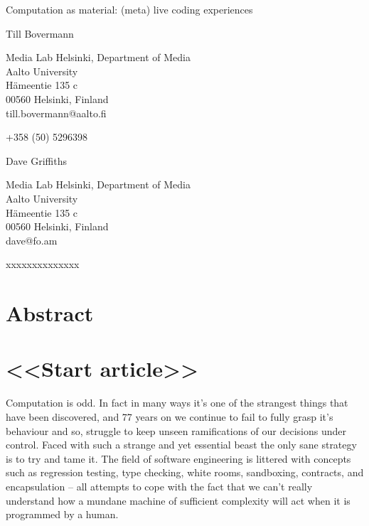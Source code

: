 \documentclass[letterpaper, 12pt]{article}
\begin{document}
{\cmjTitle 	Computation as material: (meta) live coding experiences}
\vspace*{24pt}


{\cmjAuthor Till Bovermann}
\newline
\begin{cmjAuthorAddress}
	Media Lab Helsinki, Department of Media\\
	Aalto University\\
	H\"ameentie 135 c\\
	00560 Helsinki, Finland\\
	till.bovermann@aalto.fi
\end{cmjAuthorAddress}

\vspace*{24pt}
{\cmjAuthorPhone +358 (50) 5296398}
\vspace*{24pt}

{\cmjAuthor Dave Griffiths}
\newline
\begin{cmjAuthorAddress}
	Media Lab Helsinki, Department of Media\\
	Aalto University\\
	H\"ameentie 135 c\\
	00560 Helsinki, Finland\\
	dave@fo.am
\end{cmjAuthorAddress}

\vspace*{24pt}
{\cmjAuthorPhone xxxxxxxxxxxxxx}
\vspace*{24pt}


\section{Abstract}



\section{<<Start article>>}


Computation is odd. 
In fact in many ways it's one of the strangest things that have been discovered, and 77 years on we continue to fail to fully grasp it's behaviour and so, struggle to keep unseen ramifications of our decisions under control. Faced with such a strange and yet essential beast the only sane strategy is to try and tame it. 
The field of software engineering is littered with concepts such as regression testing, type checking, white rooms, sandboxing, contracts, and encapsulation -- all attempts to cope with the fact that we can't really understand how a mundane machine of sufficient complexity will act when it is programmed by a human.
\end{document}
